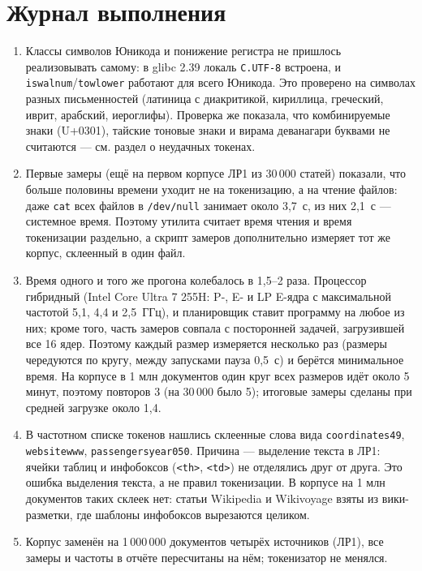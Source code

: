 \pagebreak
\section{Журнал выполнения}
\begin{enumerate}
    \item Классы символов Юникода и понижение регистра не пришлось реализовывать самому: в glibc 2.39 локаль \texttt{C.UTF-8} встроена, и \texttt{iswalnum}/\texttt{towlower} работают для всего Юникода. Это проверено на символах разных письменностей (латиница с диакритикой, кириллица, греческий, иврит, арабский, иероглифы). Проверка же показала, что комбинируемые знаки (U+0301), тайские тоновые знаки и вирама деванагари буквами не считаются --- см. раздел о неудачных токенах.
    \item Первые замеры (ещё на первом корпусе ЛР1 из 30\,000 статей) показали, что больше половины времени уходит не на токенизацию, а на чтение файлов: даже \texttt{cat} всех файлов в \texttt{/dev/null} занимает около 3,7~с, из них 2,1~с --- системное время. Поэтому утилита считает время чтения и время токенизации раздельно, а скрипт замеров дополнительно измеряет тот же корпус, склеенный в один файл.
    \item Время одного и того же прогона колебалось в 1,5--2 раза. Процессор гибридный (Intel Core Ultra 7 255H: P-, E- и LP E-ядра с максимальной частотой 5,1, 4,4 и 2,5~ГГц), и планировщик ставит программу на любое из них; кроме того, часть замеров совпала с посторонней задачей, загрузившей все 16 ядер. Поэтому каждый размер измеряется несколько раз (размеры чередуются по кругу, между запусками пауза 0,5~с) и берётся минимальное время. На корпусе в 1 млн документов один круг всех размеров идёт около 5 минут, поэтому повторов 3 (на 30\,000 было 5); итоговые замеры сделаны при средней загрузке около 1,4.
    \item В частотном списке токенов нашлись склеенные слова вида \texttt{coordinates49}, \texttt{websitewww}, \texttt{passengersyear050}. Причина --- выделение текста в ЛР1: ячейки таблиц и инфобоксов (\texttt{<th>}, \texttt{<td>}) не отделялись друг от друга. Это ошибка выделения текста, а не правил токенизации. В корпусе на 1 млн документов таких склеек нет: статьи Wikipedia и Wikivoyage взяты из вики-разметки, где шаблоны инфобоксов вырезаются целиком.
    \item Корпус заменён на 1\,000\,000 документов четырёх источников (ЛР1), все замеры и частоты в отчёте пересчитаны на нём; токенизатор не менялся.
\end{enumerate}

